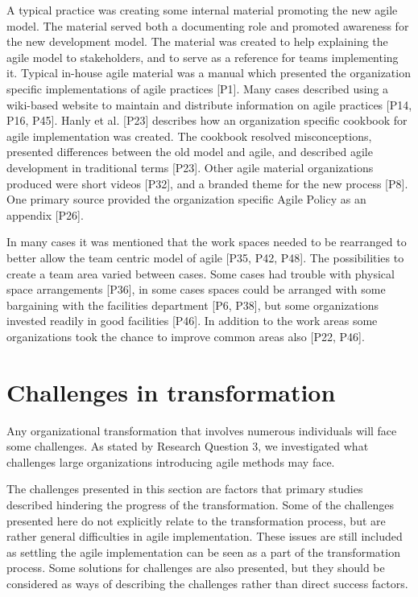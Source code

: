A typical practice was creating some internal material promoting the new agile
model. The material served both a documenting role and promoted awareness for
the new development model. The material was created to help explaining the agile
model to stakeholders, and to serve as a reference for teams implementing it.
Typical in-house agile material was a manual which presented the organization
specific implementations of agile practices [P1]. Many cases described using a
wiki-based website to maintain and distribute information on agile practices
[P14, P16, P45]. Hanly et al. [P23] describes how an organization specific
cookbook for agile implementation was created. The cookbook resolved
misconceptions, presented differences between the old model and agile, and
described agile development in traditional terms [P23]. Other agile material
organizations produced were short videos [P32], and a branded theme for the new
process [P8]. One primary source provided the organization specific Agile Policy
as an appendix [P26].


In many cases it was mentioned that the work spaces needed to be rearranged to
better allow the team centric model of agile [P35, P42, P48]. The possibilities
to create a team area varied between cases. Some cases had trouble with physical
space arrangements [P36], in some cases spaces could be arranged with some
bargaining with the facilities department [P6, P38], but some organizations
invested readily in good facilities [P46]. In addition to the work areas some
organizations took the chance to improve common areas also [P22, P46].


\clearpage

\section{Challenges in transformation}

Any organizational transformation that involves numerous individuals will face
some challenges. As stated by Research Question 3, we investigated what
challenges large organizations introducing agile methods may face.

The challenges presented in this section are factors that primary studies
described hindering the progress of the transformation. Some of the challenges
presented here do not explicitly relate to the transformation process, but are
rather general difficulties in agile implementation. These issues are still
included as settling the agile implementation can be seen as a part of the
transformation process. Some solutions for challenges are also presented, but
they should be considered as ways of describing the challenges rather than
direct success factors.

